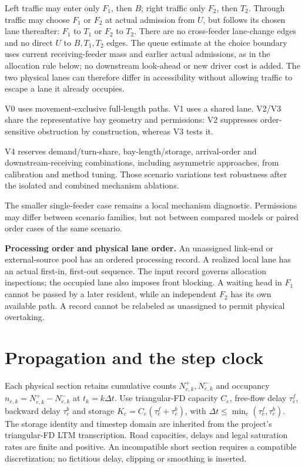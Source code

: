 \documentclass[10pt,a4paper]{article}
\newcommand{\rev}[1]{{\color{revisionred}#1}}
\begin{document}
Left traffic may enter only $F_1$, then $B$; right traffic only $F_2$,
then $T_2$. Through traffic may choose $F_1$ or $F_2$ at actual admission
from $U$, but follows its chosen lane thereafter: $F_1$ to $T_1$ or
$F_2$ to $T_2$. There are no cross-feeder lane-change edges and no direct
$U$ to $B,T_1,T_2$ edges. The queue estimate at the choice boundary uses
current receiving-feeder mass and earlier actual admissions, as in the
allocation rule below; no downstream look-ahead or new driver cost is added.
The two physical lanes can therefore differ in accessibility without
allowing traffic to escape a lane it already occupies.

V0 uses movement-exclusive full-length paths. V1 uses a shared lane.
V2/V3 share the representative bay geometry and permissions: V2 suppresses
order-sensitive obstruction by construction, whereas V3 tests it.

V4 reserves demand/turn-share, bay-length/storage, arrival-order and
downstream-receiving combinations, including asymmetric approaches,
from calibration and method tuning. Those scenario variations test
robustness after the isolated and combined mechanism ablations.
\par The smaller single-feeder
case remains a local mechanism diagnostic. Permissions may differ
between scenario families, but not between compared models or paired
order cases of the same scenario.

\textbf{Processing order and physical lane order.}
An unassigned link-end or external-source pool has an ordered processing
record. A realized local lane has an actual first-in, first-out sequence.
The input record governs allocation inspections; the occupied lane also
imposes front blocking. A waiting head in $F_1$ cannot be passed by a
later resident, while an independent $F_2$ has its own available path.
A record cannot be relabeled as unassigned to permit physical overtaking.

\section{Propagation and the step clock}

Each physical section retains cumulative counts $N^+_{e,k},N^-_{e,k}$
and occupancy $n_{e,k}=N^+_{e,k}-N^-_{e,k}$ at $t_k=k\Delta t$.
Use triangular-FD capacity $C_e$, free-flow delay $\tau^f_e$, backward
delay $\tau^b_e$ and storage $K_e=C_e(\tau^f_e+\tau^b_e)$, with
$\Delta t\leq\min_e(\tau^f_e,\tau^b_e)$.
\rev{The storage identity and timestep domain are inherited from the project's triangular-FD LTM transcription.}
Road capacities, delays and legal saturation rates are finite and positive.
An incompatible short section requires a compatible discretization;
no fictitious delay, clipping or smoothing is inserted.
\end{document}
